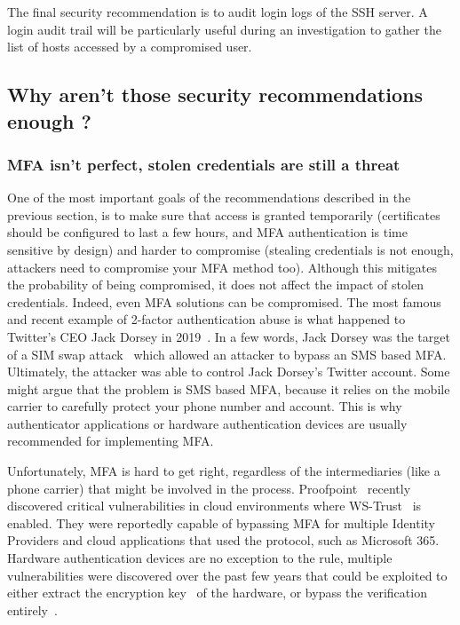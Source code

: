 The final security recommendation is to audit login logs of the SSH server.
A login audit trail will be particularly useful during an investigation to gather the list of hosts accessed by a compromised user.

\subsection{Why aren’t those security recommendations enough ?}

\subsubsection{MFA isn’t perfect, stolen credentials are still a threat}

One of the most important goals of the recommendations described in the previous section, is to make sure that access is granted temporarily (certificates should be configured to last a few hours, and MFA authentication is time sensitive by design) and harder to compromise (stealing credentials is not enough, attackers need to compromise your MFA method too).
Although this mitigates the probability of being compromised, it does not affect the impact of stolen credentials.
Indeed, even MFA solutions can be compromised.
The most famous and recent example of 2-factor authentication abuse is what happened to Twitter’s CEO Jack Dorsey in 2019~\cite{MonitoringAndProtectingSSHSessionsWithEBPF:Twitter}.
In a few words, Jack Dorsey was the target of a SIM swap attack~\cite{MonitoringAndProtectingSSHSessionsWithEBPF:MITRE} which allowed an attacker to bypass an SMS based MFA. Ultimately, the attacker was able to control Jack Dorsey’s Twitter account.
Some might argue that the problem is SMS based MFA, because it relies on the mobile carrier to carefully protect your phone number and account.
This is why authenticator applications or hardware authentication devices are usually recommended for implementing MFA.

Unfortunately, MFA is hard to get right, regardless of the intermediaries (like a phone carrier) that might be involved in the process.
Proofpoint~\cite{MonitoringAndProtectingSSHSessionsWithEBPF:Proofpoint} recently discovered critical vulnerabilities in cloud environments where WS-Trust~\cite{MonitoringAndProtectingSSHSessionsWithEBPF:WSTrust} is enabled.
They were reportedly capable of bypassing MFA for multiple Identity Providers and cloud applications that used the protocol, such as Microsoft 365.
Hardware authentication devices are no exception to the rule, multiple vulnerabilities were discovered over the past few years that could be exploited to either extract the encryption key~\cite{MonitoringAndProtectingSSHSessionsWithEBPF:Titan} of the hardware, or bypass the verification entirely~\cite{MonitoringAndProtectingSSHSessionsWithEBPF:Chrome}.

